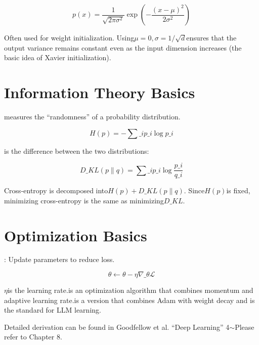 \[
p(x) = \frac{1}{\sqrt{2\pi\sigma^2}} \exp\left(-\frac{(x-\mu)^2}{2\sigma^2}\right)
\]

Often used for weight initialization.  Using$\mu=0, \sigma = 1/\sqrt{d}$ensures that the output variance remains constant even as the input dimension increases (the basic idea of ​​Xavier initialization).

\section{Information Theory Basics}

measures the ``randomness'' of a probability distribution.

\[
H(p) = -\sum\_i p\_i \log p\_i
\]

is the difference between the two distributions:

\[
D\_{KL}(p \| q) = \sum\_i p\_i \log \frac{p\_i}{q\_i}
\]

Cross-entropy is decomposed into$H(p) + D\_{KL}(p \| q)$.  Since$H(p)$is fixed, minimizing cross-entropy is the same as minimizing$D\_{KL}$.

\section{Optimization Basics}

: Update parameters to reduce loss.

\[
\theta \leftarrow \theta - \eta \nabla\_\theta \mathcal{L}
\]

$\eta$is the learning rate.is an optimization algorithm that combines momentum and adaptive learning rate.is a version that combines Adam with weight decay and is the standard for LLM learning.

Detailed derivation can be found in Goodfellow et al. ``Deep Learning'' 4$\sim$Please refer to Chapter 8.
